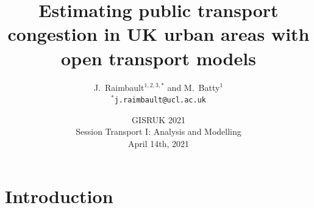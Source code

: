 



\title
[Open transportation models]{Estimating public transport congestion in UK urban areas with open transport models}
\author[Raimbault]{J.~Raimbault$^{1,2,3,\ast}$ and M.~Batty$^{1}$\\\medskip
$^{\ast}$\texttt{j.raimbault@ucl.ac.uk}
}





\date[14/04/2021]{GISRUK 2021\\
Session Transport I: Analysis and Modelling\\
April 14th, 2021\\
}

\frame{\maketitle}



\section{Introduction}


\sframe{}{




}



